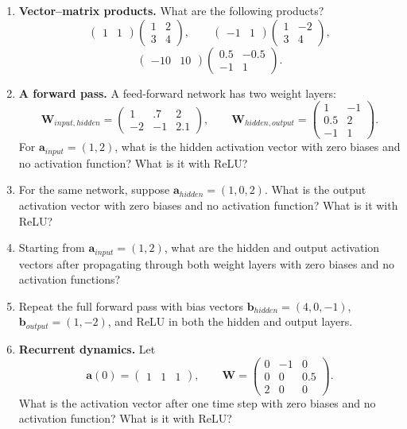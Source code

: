 \begin{enumerate}
\item \textbf{Vector--matrix products.} What are the following products?
\[
\begin{pmatrix}1&1\end{pmatrix}\begin{pmatrix}1&2\\3&4\end{pmatrix},
\qquad
\begin{pmatrix}-1&1\end{pmatrix}\begin{pmatrix}1&-2\\3&4\end{pmatrix},
\]
\[
\begin{pmatrix}-10&10\end{pmatrix}\begin{pmatrix}0.5&-0.5\\-1&1\end{pmatrix}.
\]

\item \textbf{A forward pass.} A feed-forward network has two weight layers:
\[
\mathbf{W}_{input,hidden}=\begin{pmatrix}1&.7&2\\-2&-1&2.1\end{pmatrix},
\qquad
\mathbf{W}_{hidden,output}=\begin{pmatrix}1&-1\\0.5&2\\-1&1\end{pmatrix}.
\]
For $\mathbf{a}_{input}=(1,2)$, what is the hidden activation vector with zero biases and no activation function? What is it with ReLU?

\item For the same network, suppose $\mathbf{a}_{hidden}=(1,0,2)$. What is the output activation vector with zero biases and no activation function? What is it with ReLU?

\item Starting from $\mathbf{a}_{input}=(1,2)$, what are the hidden and output activation vectors after propagating through both weight layers with zero biases and no activation functions?

\item Repeat the full forward pass with bias vectors $\mathbf{b}_{hidden}=(4,0,-1)$, $\mathbf{b}_{output}=(1,-2)$, and ReLU in both the hidden and output layers.

\item \textbf{Recurrent dynamics.} Let
\[
\mathbf{a}(0)=\begin{pmatrix}1&1&1\end{pmatrix},
\qquad
\mathbf{W}=\begin{pmatrix}0&-1&0\\0&0&0.5\\2&0&0\end{pmatrix}.
\]
What is the activation vector after one time step with zero biases and no activation function? What is it with ReLU?


\end{enumerate}
